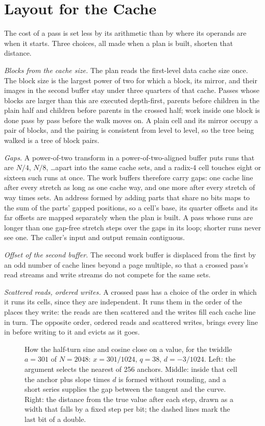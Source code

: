 \documentclass[conference]{IEEEtran}
\begin{document}
\section{Layout for the Cache}\label{sec:layout}

The cost of a pass is set less by its arithmetic than by where its operands are when it starts.
Three choices, all made when a plan is built, shorten that distance.

\emph{Blocks from the cache size.}
The plan reads the first-level data cache size once.
The block size is the largest power of two for which a block, its mirror, and their images in the second buffer stay under three quarters of that cache.
Passes whose blocks are larger than this are executed depth-first, parents before children in the plain half and children before parents in the crossed half; work inside one block is done pass by pass before the walk moves on.
A plain cell and its mirror occupy a pair of blocks, and the pairing is consistent from level to level, so the tree being walked is a tree of block pairs.

\emph{Gaps.}
A power-of-two transform in a power-of-two-aligned buffer puts runs that are $N/4$, $N/8$, \dots apart into the same cache sets, and a radix-4 cell touches eight or sixteen such runs at once.
The work buffers therefore carry gaps: one cache line after every stretch as long as one cache way, and one more after every stretch of way times sets.
An address formed by adding parts that share no bits maps to the sum of the parts' gapped positions, so a cell's base, its quarter offsets and its far offsets are mapped separately when the plan is built.
A pass whose runs are longer than one gap-free stretch steps over the gaps in its loop; shorter runs never see one.
The caller's input and output remain contiguous.

\emph{Offset of the second buffer.}
The second work buffer is displaced from the first by an odd number of cache lines beyond a page multiple, so that a crossed pass's read streams and write streams do not compete for the same sets.

\emph{Scattered reads, ordered writes.}
A crossed pass has a choice of the order in which it runs its cells, since they are independent.
It runs them in the order of the places they write: the reads are then scattered and the writes fill each cache line in turn.
The opposite order, ordered reads and scattered writes, brings every line in before writing to it and evicts as it goes.

\begin{figure}[t]
\centering

\caption{How the half-turn sine and cosine close on a value, for the twiddle $a=301$ of $N=2048$: $x=301/1024$, $q=38$, $d=-3/1024$. Left: the argument selects the nearest of 256 anchors. Middle: inside that cell the anchor plus slope times $d$ is formed without rounding, and a short series supplies the gap between the tangent and the curve. Right: the distance from the true value after each step, drawn as a width that falls by a fixed step per bit; the dashed lines mark the last bit of a double.}
\label{fig:narrow}
\end{figure}
\end{document}
